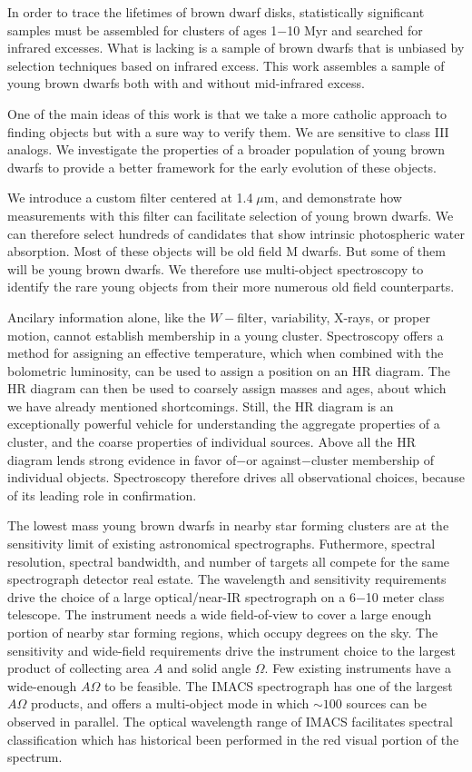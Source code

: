 In order to trace the lifetimes of brown dwarf disks, statistically significant samples must be assembled for clusters of ages 1$-$10 Myr and searched for infrared excesses.  What is lacking is a sample of brown dwarfs that is unbiased by selection techniques based on infrared excess.  This work assembles a sample of young brown dwarfs both with and without mid-infrared excess.

One of the main ideas of this work is that we take a more catholic approach to finding objects but with a sure way to verify them.  We are sensitive to class III analogs.  We investigate the properties of a broader population of young brown dwarfs to provide a better framework for the early evolution of these objects.

We introduce a custom filter centered at 1.4$\;\mu$m, and demonstrate how measurements with this filter can facilitate selection of young brown dwarfs.  We can therefore select hundreds of candidates that show intrinsic photospheric water absorption.  Most of these objects will be old field M dwarfs.  But some of them will be young brown dwarfs.  We therefore use multi-object spectroscopy to identify the rare young objects from their more numerous old field counterparts.

Ancilary information alone, like the $W-$filter, variability, X-rays, or proper motion, cannot establish membership in a young cluster.  Spectroscopy offers a method for assigning an effective temperature, which when combined with the bolometric luminosity, can be used to assign a position on an HR diagram.  The HR diagram can then be used to coarsely assign masses and ages, about which we have already mentioned shortcomings.  Still, the HR diagram is an exceptionally powerful vehicle for understanding the aggregate properties of a cluster, and the coarse properties of individual sources.  Above all the HR diagram lends strong evidence in favor of$-$or against$-$cluster membership of individual objects.  Spectroscopy therefore drives all observational choices, because of its leading role in confirmation.

The lowest mass young brown dwarfs in nearby star forming clusters are at the sensitivity limit of existing astronomical spectrographs.  Futhermore, spectral resolution, spectral bandwidth, and number of targets all compete for the same spectrograph detector real estate.  The wavelength and sensitivity requirements drive the choice of a large optical/near-IR spectrograph on a 6$-$10 meter class telescope.  The instrument needs a wide field-of-view to cover a large enough portion of nearby star forming regions, which occupy degrees on the sky.  The sensitivity and wide-field requirements drive the instrument choice to the largest product of collecting area $A$ and solid angle $\Omega$.  Few existing instruments have a wide-enough $A\Omega$ to be feasible.  The IMACS spectrograph has one of the largest $A\Omega$ products, and offers a multi-object mode in which $\sim100$ sources can be observed in parallel.  The optical wavelength range of IMACS facilitates spectral classification which has historical been performed in the red visual portion of the spectrum.


